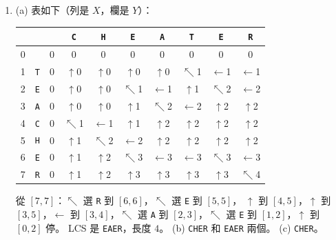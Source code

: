 \begin{enumerate}
\item (a) 表如下（列是 $X$，欄是 $Y$）：
{\footnotesize
\begin{center}
\begin{tabular}{cc*{8}{c}}
& &  & \texttt{C} & \texttt{H} & \texttt{E} & \texttt{A} & \texttt{T} & \texttt{E} & \texttt{R} \\
\midrule
0 &  & 0 & 0 & 0 & 0 & 0 & 0 & 0 & 0 \\
1 & \texttt{T} & 0 & $\uparrow$0 & $\uparrow$0 & $\uparrow$0 & $\uparrow$0 & $\nwarrow$1 & $\leftarrow$1 & $\leftarrow$1 \\
2 & \texttt{E} & 0 & $\uparrow$0 & $\uparrow$0 & $\nwarrow$1 & $\leftarrow$1 & $\uparrow$1 & $\nwarrow$2 & $\leftarrow$2 \\
3 & \texttt{A} & 0 & $\uparrow$0 & $\uparrow$0 & $\uparrow$1 & $\nwarrow$2 & $\leftarrow$2 & $\uparrow$2 & $\uparrow$2 \\
4 & \texttt{C} & 0 & $\nwarrow$1 & $\leftarrow$1 & $\uparrow$1 & $\uparrow$2 & $\uparrow$2 & $\uparrow$2 & $\uparrow$2 \\
5 & \texttt{H} & 0 & $\uparrow$1 & $\nwarrow$2 & $\leftarrow$2 & $\uparrow$2 & $\uparrow$2 & $\uparrow$2 & $\uparrow$2 \\
6 & \texttt{E} & 0 & $\uparrow$1 & $\uparrow$2 & $\nwarrow$3 & $\leftarrow$3 & $\leftarrow$3 & $\nwarrow$3 & $\leftarrow$3 \\
7 & \texttt{R} & 0 & $\uparrow$1 & $\uparrow$2 & $\uparrow$3 & $\uparrow$3 & $\uparrow$3 & $\uparrow$3 & $\nwarrow$4 \\
\end{tabular}
\end{center}
}
從 $[7, 7]$：$\nwarrow$ 選 \texttt{R} 到 $[6, 6]$，$\nwarrow$ 選 \texttt{E} 到 $[5, 5]$，
$\uparrow$ 到 $[4, 5]$，$\uparrow$ 到 $[3, 5]$，$\leftarrow$ 到 $[3, 4]$，$\nwarrow$ 選
\texttt{A} 到 $[2, 3]$，$\nwarrow$ 選 \texttt{E} 到 $[1, 2]$，$\uparrow$ 到 $[0, 2]$ 停。 LCS 是
\texttt{EAER}，長度 $4$。
(b) \texttt{CHER} 和 \texttt{EAER} 兩個。
(c) \texttt{CHER}。


\end{enumerate}
